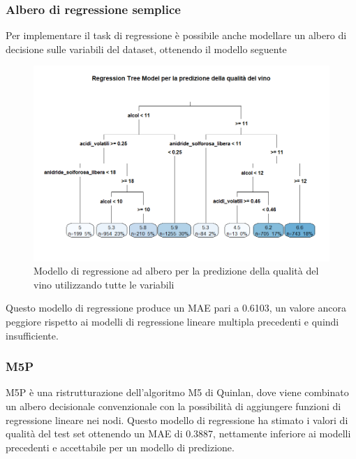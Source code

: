 \documentclass[12pt]{article}
\begin{document}
\subsubsection{Albero di regressione semplice}
Per implementare il task di regressione è possibile anche modellare un albero di decisione sulle variabili del dataset, ottenendo il modello seguente
\begin{figure}[!htb]
    \centering
    \includegraphics[width=1\textwidth]{immagini/regrtr.png}
    \caption{Modello di regressione ad albero per la predizione della qualità del vino utilizzando tutte le variabili}
\end{figure}
\FloatBarrier
Questo modello di regressione produce un MAE pari a 0.6103, un valore ancora peggiore rispetto ai modelli di regressione lineare multipla precedenti e quindi insufficiente.
\subsubsection{M5P}
M5P è una ristrutturazione dell'algoritmo M5 di Quinlan, dove viene combinato un albero decisionale convenzionale con la possibilità di aggiungere funzioni di regressione lineare nei nodi. Questo modello di regressione ha stimato i valori di qualità del test set ottenendo un MAE di 0.3887, nettamente inferiore ai modelli precedenti e accettabile per un modello di predizione.
\end{document}

